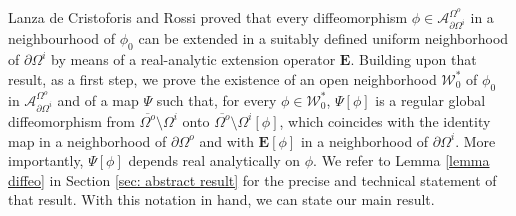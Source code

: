 \documentclass[11pt,reqno,a4paper]{amsart}
\theoremstyle{plain}
\theoremstyle{definition}
\begin{document}
Lanza de Cristoforis and Rossi \cite{LaRo08} proved that every diffeomorphism $\phi \in \mathcal{A}^{\Omega^o}_{\partial\Omega^i}$ in a neighbourhood of $\phi_0$ can be extended in a suitably defined uniform neighborhood of $\partial\Omega^i$ by means of a real-analytic extension operator $\mathbf{E}$. Building upon that result, as a first step, we prove the existence of an open neighborhood $\mathcal{W}^\ast_0$ of $\phi_0$ in $\mathcal{A}^{\Omega^o}_{\partial\Omega^i}$ and of a map $\Psi$ such that, for every $\phi \in \mathcal{W}^\ast_0$, $\Psi[\phi]$ is a regular global diffeomorphism from $\overline{\Omega^o}\setminus\Omega^i$ onto $\overline{\Omega^o} \setminus \Omega^i[\phi]$, which coincides with the identity map in a neighborhood of $\partial\Omega^o$ and with $\mathbf{E}[\phi]$ in a neighborhood of $\partial\Omega^i$. More importantly, $\Psi[\phi]$ depends real analytically on $\phi$. We refer to Lemma \ref{lemma diffeo} in Section \ref{sec: abstract result} for the precise and technical statement of that result. With this notation in hand, we can state our main result.
\end{document}
